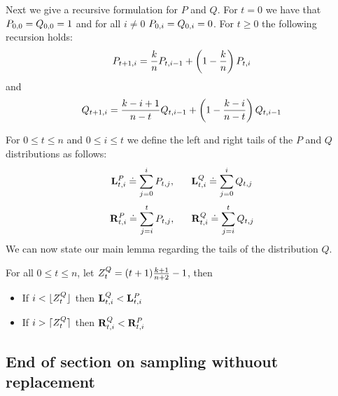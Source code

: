\fi

Next we give a recursive formulation for $P$ and $Q$. \newline
For $t=0$ we have that 
$P_{0,0}=Q_{0,0}=1$ and for all $i\neq 0$
$P_{0,i}=Q_{0,i}=0$.
For $t \geq 0$ the following recursion holds:
\[
P_{t+1,i}=\frac{k}{n} P_{t,i-1} + \left(1-\frac{k}{n}\right)P_{t,i}
\]
and
\[
Q_{t+1,i}=\frac{k-i+1}{n-t}Q_{t,i-1} + \left(1-\frac{k-i}{n-t}\right)Q_{t,i-1}
\]

For $0 \leq t \leq n$ and $0 \leq i \leq t$ we define the left and
right tails of the $P$ and $Q$ distributions as follows:
\[
{\mathbf L}^{P}_{t,i} \doteq \sum_{j=0}^i P_{t,j},\;\;\;\;\;\;
{\mathbf L}^{Q}_{t,i} \doteq \sum_{j=0}^i Q_{t,j}
\]
\[
{\mathbf R}^{P}_{t,i} \doteq \sum_{j=i}^t P_{t,j},\;\;\;\;\;\;
{\mathbf R}^{Q}_{t,i} \doteq \sum_{j=i}^t Q_{t,j}
\]
We can now state our main lemma regarding the tails of the
distribution $Q$.
\begin{lemma}
  For all $0\leq t \leq n$, let $Z^{Q}_t = (t+1)\frac{k+1}{n+2}-1$,
  then 
  \begin{itemize}
    \item If $i < \lfloor Z^{Q}_t \rfloor$ then ${\mathbf L}^{Q}_{t,i} < {\mathbf L}^{P}_{t,i}$
    \item If $i > \lceil Z^{Q}_t \rceil$ then ${\mathbf R}^{Q}_{t,i} < {\mathbf R}^{P}_{t,i}$
    \end{itemize}
\end{lemma}

\subsection{End of section on sampling withuout replacement}
